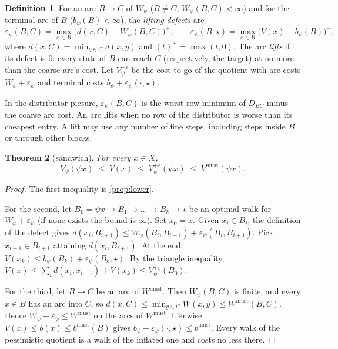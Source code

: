 \documentclass[11pt]{article}
\newtheorem{theorem}{Theorem}[section]
\theoremstyle{definition}
\newtheorem{definition}[theorem]{Definition}
\theoremstyle{remark}
\newcommand{\eps}{\varepsilon}
\newcommand{\dd}{d}
\newcommand{\Wm}{W^{\mathrm{must}}}
\newcommand{\Vm}{V^{\mathrm{must}}}
\newcommand{\tgt}{\star}
\begin{document}
\begin{definition}\label{def:defect}
For an arc $B \to C$ of $W_\psi$ ($B \ne C$, $W_\psi(B,C) < \infty$) and for the
terminal arc of $B$ ($b_\psi(B) < \infty$), the \emph{lifting defects} are
\[
\eps_\psi(B,C) = \max_{x \in B}\big(\dd(x,C) - W_\psi(B,C)\big)^+, \qquad
\eps_\psi(B,\tgt) = \max_{x \in B}\big(V(x) - b_\psi(B)\big)^+,
\]
where $\dd(x,C) = \min_{y\in C}\dd(x,y)$ and $(t)^+ = \max(t,0)$. The arc
\emph{lifts} if its defect is $0$: every state of $B$ can reach $C$ (respectively,
the target) at no more than the coarse arc's cost. Let $V_\psi^{+\eps}$ be the
cost-to-go of the quotient with arc costs $W_\psi + \eps_\psi$ and terminal costs
$b_\psi + \eps_\psi(\cdot,\tgt)$.
\end{definition}

In the distributor picture, $\eps_\psi(B,C)$ is the worst row minimum of $D_{BC}$
minus the coarse arc cost. An arc lifts when no row of the distributor is worse
than its cheapest entry. A lift may use any number of fine steps, including steps
inside $B$ or through other blocks.

\begin{theorem}[sandwich]\label{thm:sandwich}
For every $x \in X$,
\[
V_\psi(\psi x) \;\le\; V(x) \;\le\; V_\psi^{+\eps}(\psi x) \;\le\; \Vm(\psi x).
\]
\end{theorem}
\begin{proof}
The first inequality is \cref{prop:lower}.

For the second, let $B_0 = \psi x \to B_1 \to \dots \to B_k \to \tgt$ be an optimal
walk for $W_\psi + \eps_\psi$ (if none exists the bound is $\infty$). Set
$x_0 = x$. Given $x_i \in B_i$, the definition of the defect gives
$\dd(x_i, B_{i+1}) \le W_\psi(B_i,B_{i+1}) + \eps_\psi(B_i,B_{i+1})$. Pick
$x_{i+1} \in B_{i+1}$ attaining $\dd(x_i, B_{i+1})$. At the end,
$V(x_k) \le b_\psi(B_k) + \eps_\psi(B_k,\tgt)$. By the triangle inequality,
$V(x) \le \sum_i \dd(x_i,x_{i+1}) + V(x_k) \le V_\psi^{+\eps}(B_0)$.

For the third, let $B \to C$ be an arc of $\Wm$. Then $W_\psi(B,C)$ is finite, and
every $x \in B$ has an arc into $C$, so
$\dd(x,C) \le \min_{y \in C} W(x,y) \le \Wm(B,C)$. Hence
$W_\psi + \eps_\psi \le \Wm$ on the arcs of $\Wm$. Likewise
$V(x) \le b(x) \le b^{\mathrm{must}}(B)$ gives
$b_\psi + \eps_\psi(\cdot,\tgt) \le b^{\mathrm{must}}$. Every walk of the
pessimistic quotient is a walk of the inflated one and costs no less there.
\end{proof}
\end{document}
